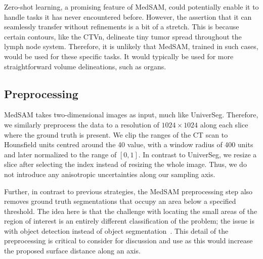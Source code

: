 \documentclass[11pt,twoside]{report}
\begin{document}
Zero-shot learning, a promising feature of MedSAM, could potentially enable it to handle tasks it has never encountered before. However, the assertion that it can seamlessly transfer without refinements is a bit of a stretch. This is because certain contours, like the CTVn, delineate tiny tumor spread throughout the lymph node system. Therefore, it is unlikely that MedSAM, trained in such cases, would be used for these specific tasks. It would typically be used for more straightforward volume delineations, such as organs.

\subsection{Preprocessing}

MedSAM takes two-dimensional images as input, much like UniverSeg. Therefore, we similarly preprocess the data to a resolution of $1024 \times 1024$ along each slice where the ground truth is present. We clip the ranges of the CT scan to Hounsfield units centred around the 40 value, with a window radius of 400 units and later normalized to the range of $[0,1]$. In contrast to UniverSeg, we resize a slice after selecting the index instead of resizing the whole image. Thus, we do not introduce any anisotropic uncertainties along our sampling axis.

Further, in contrast to previous strategies, the MedSAM preprocessing step also removes ground truth segmentations that occupy an area below a specified threshold. The idea here is that the challenge with locating the small areas of the region of interest is an entirely different classification of the problem; the issue is with object detection instead of object segmentation~\cite{SAM, Ma2024}. This detail of the preprocessing is critical to consider for discussion and use as this would increase the proposed surface distance along an axis.



\end{document}
